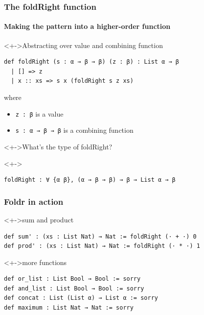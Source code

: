 \documentclass{beamer}
\begin{document}
\begin{frame}[fragile]
  \frametitle{The foldRight function}
  \framesubtitle{Making the pattern into a higher-order function}
  \begin{block}<+->{Abstracting over value and combining function}
\begin{lstlisting}
def foldRight (s : α → β → β) (z : β) : List α → β
  | [] => z
  | x :: xs => s x (foldRight s z xs)
\end{lstlisting}
    where
    \begin{itemize}
    \item \lstinline{z : β} is a value
    \item \lstinline{s : α → β → β} is a combining function
    \end{itemize}
  \end{block}
  \begin{alertblock}<+->{What's the type of foldRight?}
    \vspace{-\baselineskip}
  \end{alertblock}
  \begin{block}<+->{}
\begin{lstlisting}
foldRight : ∀ {α β}, (α → β → β) → β → List α → β
\end{lstlisting}
  \end{block}
\end{frame}
\begin{frame}[fragile]
  \frametitle{Foldr in action}
  \begin{block}<+->{sum and product}
\begin{lstlisting}
def sum' : (xs : List Nat) → Nat := foldRight (· + ·) 0
def prod' : (xs : List Nat) → Nat := foldRight (· * ·) 1
\end{lstlisting}
  \end{block}
  \begin{block}<+->{more functions}
\begin{lstlisting}
def or_list : List Bool → Bool := sorry
def and_list : List Bool → Bool := sorry
def concat : List (List α) → List α := sorry
def maximum : List Nat → Nat := sorry
\end{lstlisting}
  \end{block}
\end{frame}
\end{document}
